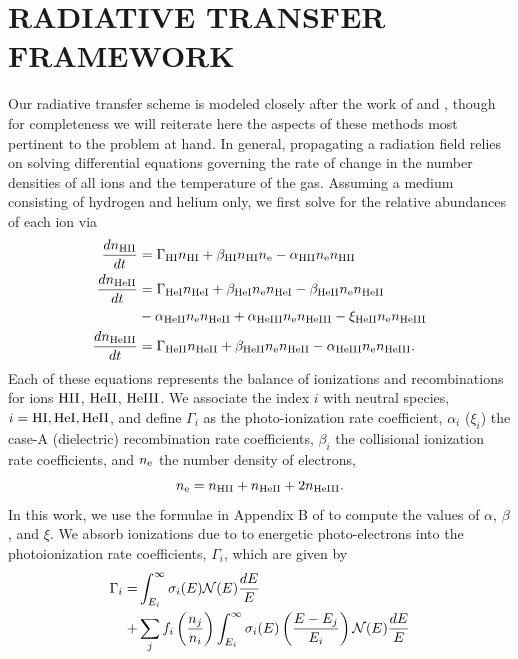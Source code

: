 \documentclass[preprint2]{aastex}              %
\begin{document}
\section{RADIATIVE TRANSFER FRAMEWORK}
Our radiative transfer scheme is modeled closely after the work of \cite{Fukugita1994} and \cite{Thomas2008}, though for completeness we will reiterate here the aspects of these methods most pertinent to the problem at hand.  In general, propagating a radiation field relies on solving differential equations governing the rate of change in the number densities of all ions and the temperature of the gas.  Assuming a medium consisting of hydrogen and helium only, we first solve for the relative abundances of each ion via
\begin{align}
    \frac{d n_{\text{HII}}}{dt} & = \Gamma_{\text{HI}} n_{\text{HI}} + \beta_{\text{HI}} n_{\text{HI}} n_{\text{e}} - \alpha_{\text{HII}} n_{\text{e}} n_{\text{HII}}   \label{eq:HIIRateEquation} \\ 
    \frac{d n_{\text{HeII}}}{dt} & = \Gamma_{\text{HeI}} n_{\text{HeI}} + \beta_{\text{HeI}} n_{\text{e}} n_{\text{HeI}} - \beta_{\text{HeII}} n_{\text{e}} n_{\text{HeII}} \nonumber \\ 
    & - \alpha_{\text{HeII}} n_{\text{e}} n_{\text{HeII}} + \alpha_{\text{HeIII}} n_{\text{e}} n_{\text{HeIII}} - \xi_{\text{HeII}} n_{\text{e}} n_{\text{HeIII}}  \label{eq:HeIIRateEquation} \\ 
    \frac{d n_{\text{HeIII}}}{dt} & = \Gamma_{\text{HeII}} n_{\text{HeII}} + \beta_{\text{HeII}} n_{\text{e}} n_{\text{HeII}} - \alpha_{\text{HeIII}} n_{\text{e}} n_{\text{HeIII}} . \label{eq:HeIIIRateEquation}
\end{align}
Each of these equations represents the balance of ionizations and
recombinations for ions $\text{HII}$, $\text{HeII}$, $\text{HeIII}$. We associate the index $i$
with neutral species, $i = \text{HI}, \text{HeI}, \text{HeII}$, and define $\Gamma_i$ as the
photo-ionization rate coefficient, $\alpha_i$ ($\xi_i$) the case-A
(dielectric) recombination rate coefficients, $\beta_i$ the collisional
ionization rate coefficients, and $n_{\text{e}}$ the number density of electrons,
\begin{equation}
    n_{\text{e}} = n_{\text{HII}} + n_{\text{HeII}} + 2n_{\text{HeIII}} .
\end{equation}
In this work, we use the formulae in Appendix B of \citet{Fukugita1994} to compute the values of $\alpha$, $\beta$, and $\xi$.    We absorb ionizations due to to energetic photo-electrons into the  photoionization rate coefficients, $\Gamma_i$, which are given by
\begin{align}
    \Gamma_i = & \int_{E_i}^{\infty} \sigma_i(E) \mathcal{N}(E) \frac{dE}{E} \nonumber \\  + & \sum_j f_i \left(\frac{n_j}{n_i}\right) \int_{E_i}^{\infty} \sigma_i(E)\left(\frac{E - E_j}{E_i}\right) \mathcal{N}(E) \frac{dE}{E} \label{eq:PhotoionizationRate}
\end{align}
\end{document}
